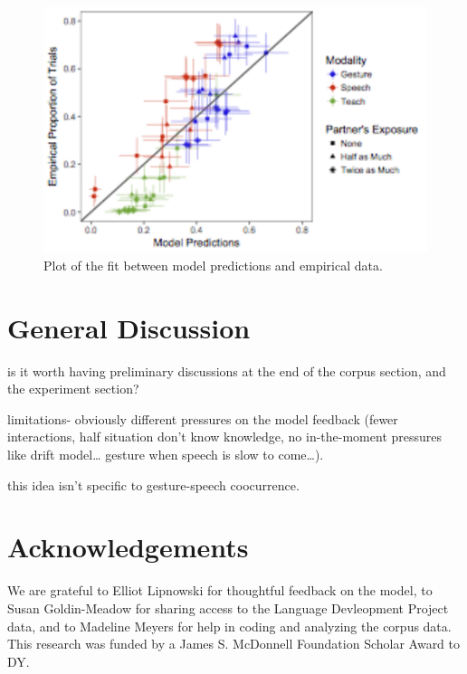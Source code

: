 \documentclass[10pt, letterpaper]{article}
\newenvironment{CodeChunk}{}{}
\begin{document}
\begin{CodeChunk}
\begin{figure}[H]

{\centering \includegraphics{figs/image4-1} 

}

\caption[Plot of the fit between model predictions and empirical data]{Plot of the fit between model predictions and empirical data.}\label{fig:image4}
\end{figure}
\end{CodeChunk}

\section{General Discussion}\label{general-discussion}

is it worth having preliminary discussions at the end of the corpus
section, and the experiment section?

limitations- obviously different pressures on the model feedback (fewer
interactions, half situation don't know knowledge, no in-the-moment
pressures like drift model\ldots{} gesture when speech is slow to
come\ldots{}).

this idea isn't specific to gesture-speech coocurrence.

\section{Acknowledgements}\label{acknowledgements}

We are grateful to Elliot Lipnowski for thoughtful feedback on the
model, to Susan Goldin-Meadow for sharing access to the Language
Devleopment Project data, and to Madeline Meyers for help in coding and
analyzing the corpus data. This research was funded by a James S.
McDonnell Foundation Scholar Award to DY.
\end{document}

